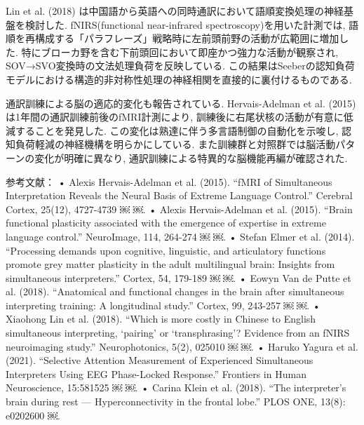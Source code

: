 Lin et al. (2018) \cite{lin2018costly}は中国語から英語への同時通訳において語順変換処理の神経基盤を検討した.
fNIRS(functional near-infrared spectroscopy)を用いた計測では, 語順を再構成する「パラフレーズ」戦略時に左前頭前野の活動が広範囲に増加した.
特にブローカ野を含む下前頭回において即座かつ強力な活動が観察され, SOV→SVO変換時の文法処理負荷を反映している.
この結果はSeeberの認知負荷モデルにおける構造的非対称性処理の神経相関を直接的に裏付けるものである.

通訳訓練による脳の適応的変化も報告されている.
Hervais-Adelman et al. (2015) \cite{hervais2015plasticity}は1年間の通訳訓練前後のfMRI計測により, 訓練後に右尾状核の活動が有意に低減することを発見した.
この変化は熟達に伴う多言語制御の自動化を示唆し, 認知負荷軽減の神経機構を明らかにしている.
また訓練群と対照群では脳活動パターンの変化が明確に異なり, 通訳訓練による特異的な脳機能再編が確認された.

参考文献：
	•	Alexis Hervais-Adelman et al. (2015). “fMRI of Simultaneous Interpretation Reveals the Neural Basis of Extreme Language Control.” Cerebral Cortex, 25(12), 4727-4739 ￼ ￼.
	•	Alexis Hervais-Adelman et al. (2015). “Brain functional plasticity associated with the emergence of expertise in extreme language control.” NeuroImage, 114, 264-274 ￼ ￼.
	•	Stefan Elmer et al. (2014). “Processing demands upon cognitive, linguistic, and articulatory functions promote grey matter plasticity in the adult multilingual brain: Insights from simultaneous interpreters.” Cortex, 54, 179-189 ￼ ￼.
	•	Eowyn Van de Putte et al. (2018). “Anatomical and functional changes in the brain after simultaneous interpreting training: A longitudinal study.” Cortex, 99, 243-257 ￼ ￼.
	•	Xiaohong Lin et al. (2018). “Which is more costly in Chinese to English simultaneous interpreting, ‘pairing’ or ‘transphrasing’? Evidence from an fNIRS neuroimaging study.” Neurophotonics, 5(2), 025010 ￼ ￼.
	•	Haruko Yagura et al. (2021). “Selective Attention Measurement of Experienced Simultaneous Interpreters Using EEG Phase-Locked Response.” Frontiers in Human Neuroscience, 15:581525 ￼ ￼.
	•	Carina Klein et al. (2018). “The interpreter’s brain during rest — Hyperconnectivity in the frontal lobe.” PLOS ONE, 13(8): e0202600 ￼.